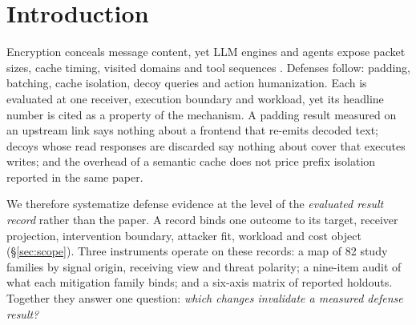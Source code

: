 \section{Introduction}\label{sec:introduction}
Encryption conceals message content, yet LLM engines and agents expose packet sizes, cache timing, visited domains and tool sequences \cite{weiss2024prompt,promptpeek2025,earlybird2025,agentprint2025,uitraces2026,jeong2026wra}. Defenses follow: padding, batching, cache isolation, decoy queries and action humanization. Each is evaluated at one receiver, execution boundary and workload, yet its headline number is cited as a property of the mechanism. A padding result measured on an upstream link says nothing about a frontend that re-emits decoded text; decoys whose read responses are discarded say nothing about cover that executes writes; and the overhead of a semantic cache does not price prefix isolation reported in the same paper.

We therefore systematize defense evidence at the level of the \emph{evaluated result record} rather than the paper. A record binds one outcome to its target, receiver projection, intervention boundary, attacker fit, workload and cost object (\S\ref{sec:scope}). Three instruments operate on these records: a map of 82 study families by signal origin, receiving view and threat polarity; a nine-item audit of what each mitigation family binds; and a six-axis matrix of reported holdouts. Together they answer one question: \emph{which changes invalidate a measured defense result?}

